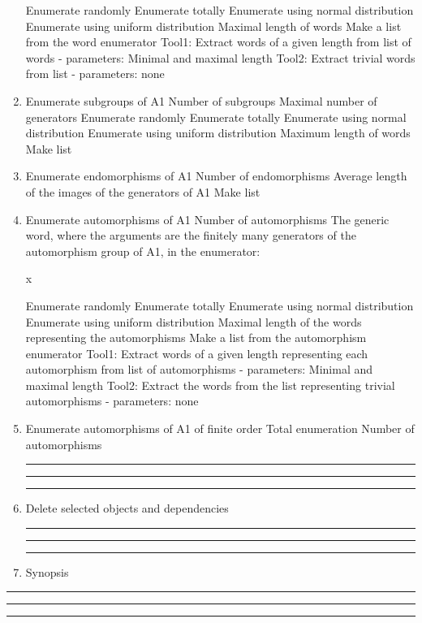 \begin{enumerate}
\subsubitem Enumerate randomly
\subsubitem Enumerate totally
\subsubitem Enumerate using normal distribution
\subsubitem Enumerate using uniform distribution
\subsubitem Maximal length of words
\bigskip
\subitem Make a list from the word enumerator
\subsubitem Tool1: Extract words of a given length
from list of words - parameters: Minimal and maximal length
\subsubitem Tool2: Extract trivial words from list - parameters: none
\bigskip
\item Enumerate subgroups of A1
\subitem Number of subgroups
\subitem Maximal number of generators
\subsubitem Enumerate randomly
\subsubitem Enumerate totally
\subsubitem Enumerate using normal distribution
\subsubitem Enumerate using uniform distribution
\subsubitem Maximum length of words
\bigskip
\subitem Make list

\item Enumerate endomorphisms of A1
\subitem Number of endomorphisms
\subsubitem Average length of the images of the generators of A1
\bigskip
\subitem Make list
\bigskip

\item Enumerate automorphisms of A1
\subitem Number of automorphisms
\subsubitem The generic word, where the arguments are the finitely
many  generators of the automorphism group of A1, in the enumerator:

\hskip 2.0in    x

\subsubitem Enumerate randomly
\subsubitem Enumerate totally
\subsubitem Enumerate using normal distribution
\subsubitem Enumerate using uniform distribution
\subsubitem Maximal length of the words representing the automorphisms
\bigskip
\subitem Make a list from the automorphism enumerator
\subsubitem Tool1: Extract words of a given length representing each
automorphism from list of automorphisms - parameters:
Minimal and maximal length
\subsubitem Tool2: Extract the words from the list representing
trivial automorphisms - parameters: none
\bigskip
\item Enumerate automorphisms of A1 of finite order
\subitem Total enumeration
\subsubitem Number of automorphisms
\bigskip
\hrule\hrule\hrule
\item Delete selected objects and dependencies
\bigskip
\hrule\hrule\hrule
\item Synopsis
\end{enumerate}
\bigskip
\hrule\hrule\hrule
